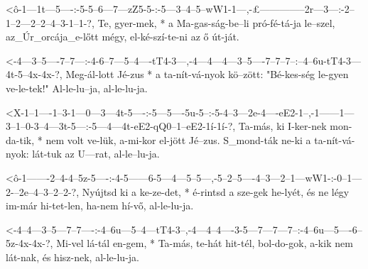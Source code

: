 


  {<ô-1---1t---5----:-5-5--6---7---zZ5-5-:-5---3--4--5--wW1-1---,-£--------------2r---3---:-2--1--2---2--2--4--3-1--1-?,}
  {   Te, gyer-mek, * a Ma-gas-ság-be--li  pró-fé-tá-ja le--szel, az_Úr_orcája_e-lőtt mégy, el-ké-szí-te-ni az ő út-ját.}




  {<-4---3--5----7--7---:-4-6--7---5--4----tT4-3---,-4---4---4---3--5----7--7--7--:--4--6u-tT4-3---4t-5--4x-4x-?,}
  {  Meg-ál-lott Jé-zus * a ta-nít-vá-nyok kö--zött: "Bé-kes-ség le-gyen ve-le-tek!" Al-le-lu--ja, al-le-lu-ja.}

  {<X-1--1----1--3-1---0---3---4t-5----:-5---5----5u-5--:-5-4--3---2e-4----eE2-1--,-1------1---3--1--0-3--4---3t-5---:-5---4---4t-eE2-qQ0--1--eE2-1í-1í-?,}
  {   Ta-más, ki I-ker-nek mon-da-tik, * nem volt ve-lük, a-mi-kor el-jött Jé--zus. S_mond-ták ne-ki a ta-nít-vá-nyok: lát-tuk az U---rat, al-le--lu-ja.}

  {<ô-1-------2--4-4--5z-5----:-4-5------6-5---4---5--5---,-5--2--5----4--3---2--1---wW1-:-0--1---2-–2e--4--3--2--2-?,}
  {   Nyújtsd ki a ke-ze-det, * é-rintsd a sze-gek he-lyét, és ne légy im-már hi-tet-len,  ha-nem hí-vő, al-le-lu-ja.}

  {<-4--4---3--5---7--7----:-4--6u---5--4---tT4-3--,-4---4--4----3-5---7---7---7--:-4--6u---5----6--5z-4x-4x-?,}
  {  Mi-vel lá-tál en-gem, * Ta-más, te-hát hit-tél, bol-do-gok, a-kik nem lát-nak, és hisz-nek, al-le-lu-ja.}

